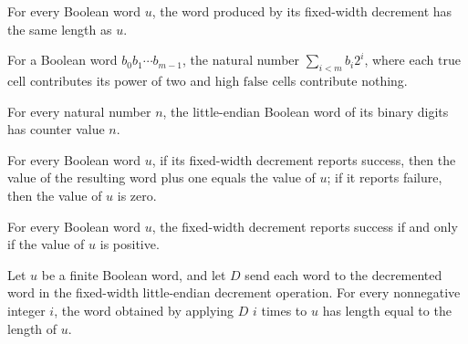 \begin{lemma}
\label{Turing.FinTM.loopDebit_length}
\leanok
{}
For every Boolean word $u$, the word produced by its fixed-width decrement has the same
length as $u$.
\end{lemma}

\begin{definition}
\label{Turing.FinTM.loopValue}
\leanok
For a Boolean word $b_0 b_1 \cdots b_{m-1}$, the natural number $\sum_{i < m} b_i
2^{i}$, where each $\mathrm{true}$ cell contributes its power of two and high
$\mathrm{false}$ cells contribute nothing.
\end{definition}

\begin{lemma}
\label{Turing.FinTM.loopValue_bits}
\leanok
{}
For every natural number $n$, the little-endian Boolean word of its binary digits has
counter value $n$.
\end{lemma}

\begin{lemma}
\label{Turing.FinTM.loopDebit_value}
\leanok
{}
For every Boolean word $u$, if its fixed-width decrement reports success, then the value
of the resulting word plus one equals the value of $u$; if it reports failure, then the
value of $u$ is zero.
\end{lemma}

\begin{lemma}
\label{Turing.FinTM.loopDebit_success}
\leanok
{}
For every Boolean word $u$, the fixed-width decrement reports success if and only if the
value of $u$ is positive.
\end{lemma}

\begin{lemma}
\label{Turing.FinTM.loopDebit_iterate_length}
\leanok
{}
Let $u$ be a finite Boolean word, and let $D$ send each word to the decremented word in
the fixed-width little-endian decrement operation. For every nonnegative integer $i$,
the word obtained by applying $D$ $i$ times to $u$ has length equal to the length of
$u$.
\end{lemma}

